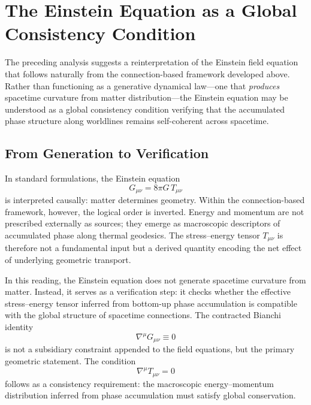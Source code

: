 \documentclass[%
 reprint,
 amsmath,amssymb,
 aps,
 prb,
]{revtex4-2}
\numberwithin{equation}{section}
\begin{document}
\section{The Einstein Equation as a Global Consistency Condition}
\label{sec:consistency}

The preceding analysis suggests a reinterpretation of the Einstein field equation that follows naturally from the connection-based framework developed above. Rather than functioning as a generative dynamical law---one that \emph{produces} spacetime curvature from matter distribution---the Einstein equation may be understood as a global consistency condition verifying that the accumulated phase structure along worldlines remains self-coherent across spacetime.

\subsection{From Generation to Verification}
\label{subsec:generation_verification}

In standard formulations, the Einstein equation
\begin{equation}
G_{\mu\nu} = 8\pi G\, T_{\mu\nu}
\end{equation}
is interpreted causally: matter determines geometry. Within the connection-based framework, however, the logical order is inverted. Energy and momentum are not prescribed externally as sources; they emerge as macroscopic descriptors of accumulated phase along thermal geodesics. The stress--energy tensor $T_{\mu\nu}$ is therefore not a fundamental input but a derived quantity encoding the net effect of underlying geometric transport.

In this reading, the Einstein equation does not generate spacetime curvature from matter. Instead, it serves as a verification step: it checks whether the effective stress--energy tensor inferred from bottom-up phase accumulation is compatible with the global structure of spacetime connections. The contracted Bianchi identity
\begin{equation}
\nabla^\mu G_{\mu\nu} \equiv 0
\end{equation}
is not a subsidiary constraint appended to the field equations, but the primary geometric statement. The condition
\begin{equation}
\nabla^\mu T_{\mu\nu} = 0
\end{equation}
follows as a consistency requirement: the macroscopic energy--momentum distribution inferred from phase accumulation must satisfy global conservation.
\end{document}

